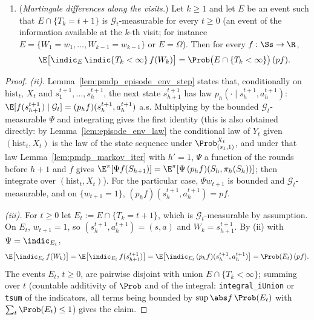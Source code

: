 \begin{lemma}
\begin{enumerate}
        $(\mathcal G_t)_t$, with $w_{t+1}$ predictable.
  \item[(iii)] (\emph{Martingale differences along the visits.}) Let $k \ge 1$ and let $E$ be an
        event such that $E \cap \{T_k = t + 1\}$ is $\mathcal G_t$-measurable for every $t \ge 0$
        (an event of the information available at the $k$-th visit; for instance
        $E = \{W_1 = w_1, \dots, W_{k-1} = w_{k-1}\}$ or $E = \Omega$). Then for every $f : \Ss \to \R$,
        \[
          \E\big[\indic_{E}\,\indic\{T_k < \infty\}\, f(W_k)\big]
          = \Prob\big(E \cap \{T_k < \infty\}\big)\,(pf) .
        \]
\end{enumerate}
\end{lemma}

\begin{proof}
\leanok
\emph{(ii).} Lemma~\ref{lem:pmdp_episode_env_step} states that, conditionally on
$\mathrm{hist}_t$, $X_t$ and $s^{t+1}_1, \dots, s^{t+1}_h$, the next state $s^{t+1}_{h+1}$ has law
$p_h(\cdot \mid s^{t+1}_h, a^{t+1}_h)$: $\E[f(s^{t+1}_{h+1}) \mid \mathcal G_t] = (p_h f)(s^{t+1}_h, a^{t+1}_h)$
a.s. Multiplying by the bounded $\mathcal G_t$-measurable $\Psi$ and integrating gives the
first identity (this is also obtained directly: by Lemma~\ref{lem:episode_env_law} the
conditional law of $Y_t$ given $(\mathrm{hist}_t, X_t)$ is the law of the state sequence under
$\Prob^{X_t}_{(s_1,1)}$, and under that law Lemma~\ref{lem:pmdp_markov_iter} with $h' = 1$,
$\Psi$ a function of the rounds before $h + 1$ and $f$ gives
$\E^{\pi}[\Psi f(S_{h+1})] = \E^\pi[\Psi\,(p_h f)(S_h, \pi_h(S_h))]$; then integrate over
$(\mathrm{hist}_t, X_t)$). For the particular case, $\Psi w_{t+1}$ is bounded and
$\mathcal G_t$-measurable, and on $\{w_{t+1} = 1\}$, $(p_h f)(s^{t+1}_h, a^{t+1}_h) = pf$.

\emph{(iii).} For $t \ge 0$ let $E_t := E \cap \{T_k = t + 1\}$, which is $\mathcal G_t$-measurable
by assumption. On $E_t$, $w_{t+1} = 1$, so $(s^{t+1}_h, a^{t+1}_h) = (s, a)$ and
$W_k = s^{t+1}_{h+1}$. By (ii) with $\Psi = \indic_{E_t}$,
\[
  \E\big[\indic_{E_t}\, f(W_k)\big] = \E\big[\indic_{E_t}\, f(s^{t+1}_{h+1})\big]
  = \E\big[\indic_{E_t}\,(p_h f)(s^{t+1}_h, a^{t+1}_h)\big] = \Prob(E_t)\,(pf) .
\]
The events $E_t$, $t \ge 0$, are pairwise disjoint with union $E \cap \{T_k < \infty\}$; summing
over $t$ (countable additivity of $\Prob$ and of the integral: \texttt{integral\_iUnion} or
\texttt{tsum} of the indicators, all terms being bounded by $\sup\abs f\,\Prob(E_t)$ with
$\sum_t\Prob(E_t) \le 1$) gives the claim.


\end{proof}
